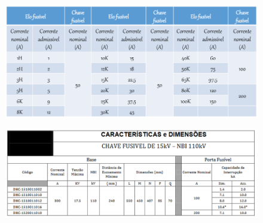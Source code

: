 \begin{figure}[H]
\begin{center}
\includegraphics[width=16cm]{tabela3.PNG}  
\label{fig:3} 
\end{center}
\end{figure}

\begin{figure}[H]
\begin{center}
\includegraphics[width=16cm]{tabela4.PNG}  
\label{fig:4} 
\end{center}
\end{figure}